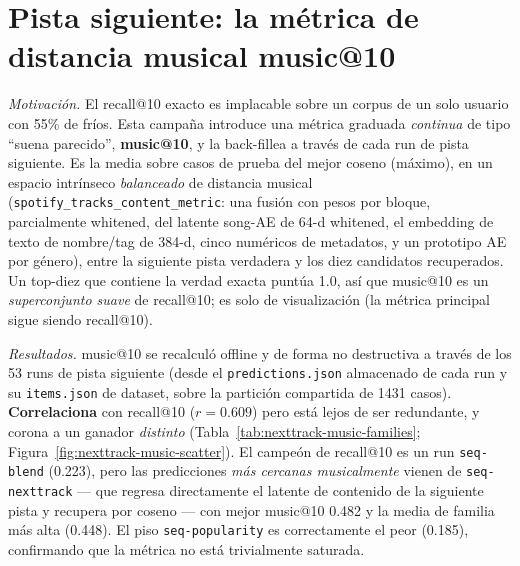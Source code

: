 \documentclass[11pt]{article}
\newcommand{\dsid}[1]{\texttt{\small #1}}
\begin{document}
\section{Pista siguiente: la métrica de distancia musical music@10}
\label{sec:nexttrack-music}
\emph{Motivación.} El recall@10 exacto es implacable sobre un corpus de un solo usuario
con 55\% de fríos. Esta campaña introduce una métrica graduada \emph{continua} de tipo
``suena parecido'', \textbf{music@10}, y la back-fillea a través de cada run de pista
siguiente. Es la media sobre casos de prueba del mejor coseno (máximo), en un espacio
intrínseco \emph{balanceado} de distancia musical (\dsid{spotify\_tracks\_content\_metric}:
una fusión con pesos por bloque, parcialmente whitened, del latente song-AE de 64-d
whitened, el embedding de texto de nombre/tag de 384-d, cinco numéricos de metadatos, y un
prototipo AE por género), entre la siguiente pista verdadera y los diez candidatos
recuperados. Un top-diez que contiene la verdad exacta puntúa \num{1.0}, así que music@10
es un \emph{superconjunto suave} de recall@10; es solo de visualización (la métrica
principal sigue siendo recall@10).

\emph{Resultados.} music@10 se recalculó offline y de forma no destructiva a través de los
53 runs de pista siguiente (desde el \texttt{predictions.json} almacenado de cada run y su
\texttt{items.json} de dataset, sobre la partición compartida de \num{1431} casos).
\textbf{Correlaciona} con recall@10 ($r = \num{0.609}$) pero está lejos de ser redundante,
y corona a un ganador \emph{distinto} (Tabla~\ref{tab:nexttrack-music-families};
Figura~\ref{fig:nexttrack-music-scatter}). El campeón de recall@10 es un run
\texttt{seq-blend} (\num{0.223}), pero las predicciones \emph{más cercanas musicalmente}
vienen de \texttt{seq-nexttrack} --- que regresa directamente el latente de contenido de
la siguiente pista y recupera por coseno --- con mejor music@10 \num{0.482} y la media de
familia más alta (\num{0.448}). El piso \texttt{seq-popularity} es correctamente el peor
(\num{0.185}), confirmando que la métrica no está trivialmente saturada.
\end{document}
